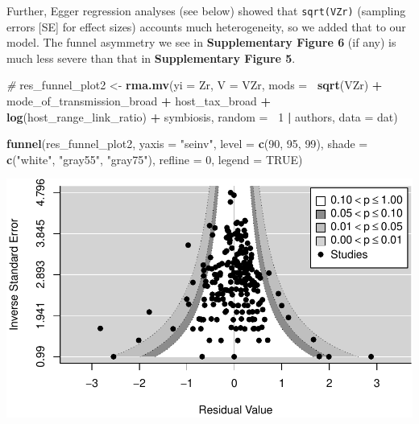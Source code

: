 \documentclass[
]{article}
\newenvironment{Shaded}{\begin{snugshade}}{\end{snugshade}}
\newcommand{\CommentTok}[1]{\textcolor[rgb]{0.56,0.35,0.01}{\textit{#1}}}
\newcommand{\DataTypeTok}[1]{\textcolor[rgb]{0.13,0.29,0.53}{#1}}
\newcommand{\DecValTok}[1]{\textcolor[rgb]{0.00,0.00,0.81}{#1}}
\newcommand{\KeywordTok}[1]{\textcolor[rgb]{0.13,0.29,0.53}{\textbf{#1}}}
\newcommand{\NormalTok}[1]{#1}
\newcommand{\OperatorTok}[1]{\textcolor[rgb]{0.81,0.36,0.00}{\textbf{#1}}}
\newcommand{\OtherTok}[1]{\textcolor[rgb]{0.56,0.35,0.01}{#1}}
\newcommand{\StringTok}[1]{\textcolor[rgb]{0.31,0.60,0.02}{#1}}
\begin{document}
Further, Egger regression analyses (see below) showed that
\texttt{sqrt(VZr)} (sampling errors {[}SE{]} for effect sizes) accounts
much heterogeneity, so we added that to our model. The funnel asymmetry
we see in \textbf{Supplementary Figure 6} (if any) is much less severe
than that in \textbf{Supplementary Figure 5}.

\begin{Shaded}
\begin{Highlighting}[]
\CommentTok{# }
\NormalTok{res_funnel_plot2 <-}\StringTok{ }\KeywordTok{rma.mv}\NormalTok{(}\DataTypeTok{yi =}\NormalTok{ Zr, }\DataTypeTok{V =}\NormalTok{ VZr, }\DataTypeTok{mods =} \OperatorTok{~}\KeywordTok{sqrt}\NormalTok{(VZr) }\OperatorTok{+}\StringTok{ }\NormalTok{mode_of_transmission_broad }\OperatorTok{+}\StringTok{ }
\StringTok{    }\NormalTok{host_tax_broad }\OperatorTok{+}\StringTok{ }\KeywordTok{log}\NormalTok{(host_range_link_ratio) }\OperatorTok{+}\StringTok{ }\NormalTok{symbiosis, }\DataTypeTok{random =} \OperatorTok{~}\DecValTok{1} \OperatorTok{|}\StringTok{ }\NormalTok{authors, }
    \DataTypeTok{data =}\NormalTok{ dat)}

\KeywordTok{funnel}\NormalTok{(res_funnel_plot2, }\DataTypeTok{yaxis =} \StringTok{"seinv"}\NormalTok{, }\DataTypeTok{level =} \KeywordTok{c}\NormalTok{(}\DecValTok{90}\NormalTok{, }\DecValTok{95}\NormalTok{, }\DecValTok{99}\NormalTok{), }\DataTypeTok{shade =} \KeywordTok{c}\NormalTok{(}\StringTok{"white"}\NormalTok{, }
    \StringTok{"gray55"}\NormalTok{, }\StringTok{"gray75"}\NormalTok{), }\DataTypeTok{refline =} \DecValTok{0}\NormalTok{, }\DataTypeTok{legend =} \OtherTok{TRUE}\NormalTok{)}
\end{Highlighting}
\end{Shaded}

\includegraphics{Supporting_Information_files/figure-latex/unnamed-chunk-52-1.pdf}
\end{document}

